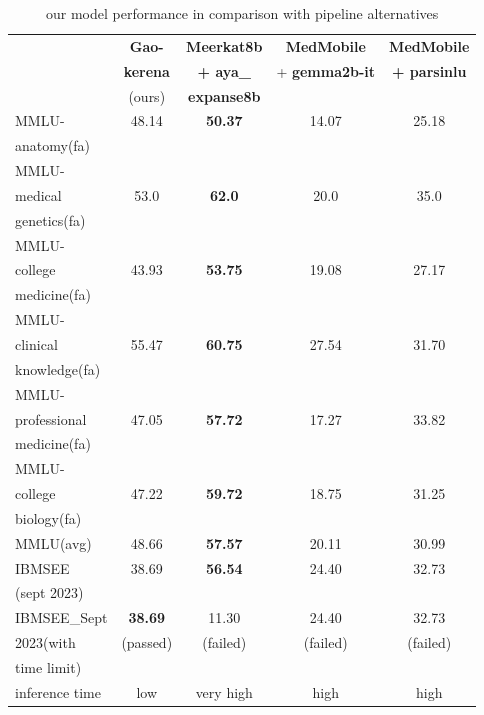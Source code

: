 \documentclass[conference]{IEEEtran}
\begin{document}
\begin{table}[ht]
	\centering
	\caption{our model performance 
		in comparison with pipeline alternatives}
	\begin{tabular}{|l|c|c|c|c|}  %
		\hline
		\textbf{} & \textbf{Gao-} & \textbf{Meerkat8b}
		& \textbf{MedMobile} & \textbf{MedMobile} \\ 
		& \textbf{kerena} & \textbf{+ aya\_} & + \textbf{gemma2b-it} & \textbf{+ parsinlu} \\
		& (ours) & \textbf{expanse8b}  &  &  \\ \hline
		MMLU- & 48.14 & \textbf{50.37} & 14.07 & 25.18 \\ 
		anatomy(fa) &  &  &  &  \\ \hline
		MMLU- &  &   &  &  \\
		medical & 53.0 & \textbf{62.0} & 20.0 & 35.0 \\ 
		genetics(fa) &  &  &  &  \\ \hline
		MMLU- &  &  &  &  \\
		college & 43.93 & \textbf{53.75} & 19.08 & 27.17 \\
		medicine(fa) &  &  &  &  \\ \hline
		MMLU- &  &  &  &  \\
		clinical& 55.47 & \textbf{60.75} & 27.54 & 31.70 \\
		knowledge(fa)&  &  &  &  \\ \hline
		MMLU- &  & &  &  \\
		professional& 47.05 & \textbf{57.72} & 17.27 & 33.82 \\ 
		medicine(fa)&  &  &  &  \\ \hline
		MMLU- &  &  &  &  \\
		college& 47.22 & \textbf{59.72} & 18.75 & 31.25 \\
		biology(fa)&  &  &  &  \\ \hline
		MMLU(avg) & 48.66 & \textbf{57.57} & 20.11 & 30.99 \\ \hline
		IBMSEE & 38.69 & \textbf{56.54} & 24.40 & 32.73 \\ 
		(sept 2023) &  &  &  &  \\  \hline
		IBMSEE\_Sept & \textbf{38.69} & 11.30 & 24.40 & 32.73 \\ 
		2023(with & (passed) & (failed) & (failed) & (failed) \\  
		time limit) &  &  &  &  \\  \hline
		inference time & low & very high & high & high \\  \hline
	\end{tabular}
	\label{tab:model_results_on_mcqa}
\end{table}
\end{document}
